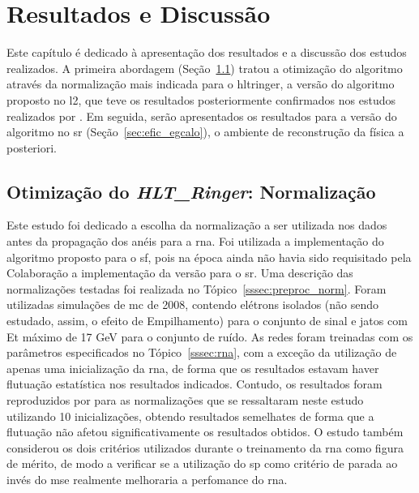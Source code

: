 \chapter{Resultados e Discussão}
\label{cap:resultados}

Este capítulo é dedicado à apresentação dos resultados e a discussão dos estudos
realizados. A primeira abordagem (Seção~\ref{sec:norm}) tratou a otimização do
algoritmo através da normalização mais indicada para o \gls{hltringer}, 
a versão do algoritmo proposto no \glsdesc{l2}, que teve os resultados 
posteriormente confirmados nos estudos realizados
por \cite{tese_torres}. Em seguida, serão apresentados os resultados para a
versão do algoritmo no \gls{sr} (Seção~\ref{sec:efic_egcalo}), o ambiente de
reconstrução da física a posteriori.


\section{Otimização do \emph{HLT\_Ringer}: Normalização}
\label{sec:norm}

Este estudo foi dedicado a escolha da normalização a ser utilizada nos
dados antes da propagação dos anéis para a \gls{rna}. Foi utilizada a
implementação do algoritmo proposto para o \gls{sf}, pois na época ainda não
havia sido requisitado pela Colaboração a implementação da versão para o \gls{sr}. Uma descrição das
normalizações testadas foi realizada no Tópico~\ref{sssec:preproc_norm}. Foram
utilizadas simulações de \gls{mc} de 2008, contendo elétrons isolados (não sendo
estudado, assim, o efeito de Empilhamento) para o conjunto de sinal e jatos com 
\gls{Et} máximo de 17 GeV para o conjunto de ruído. As redes foram treinadas com
os parâmetros especificados no Tópico~\ref{sssec:rna}, com a exceção da
utilização de apenas uma inicialização da \gls{rna}, de forma que os resultados
estavam haver flutuação estatística nos resultados indicados. Contudo, os resultados 
foram reproduzidos por \cite{tese_torres} para as normalizações que se ressaltaram 
neste estudo utilizando 10 inicializações, obtendo resultados semelhates de 
forma que a flutuação não afetou significativamente os resultados obtidos. O
estudo também considerou os dois critérios utilizados durante o treinamento da
\gls{rna} como figura de mérito, de modo a verificar se a utilização do \gls{sp}
como critério de parada ao invés do \gls{mse} realmente melhoraria a perfomance
do \gls{rna}.

